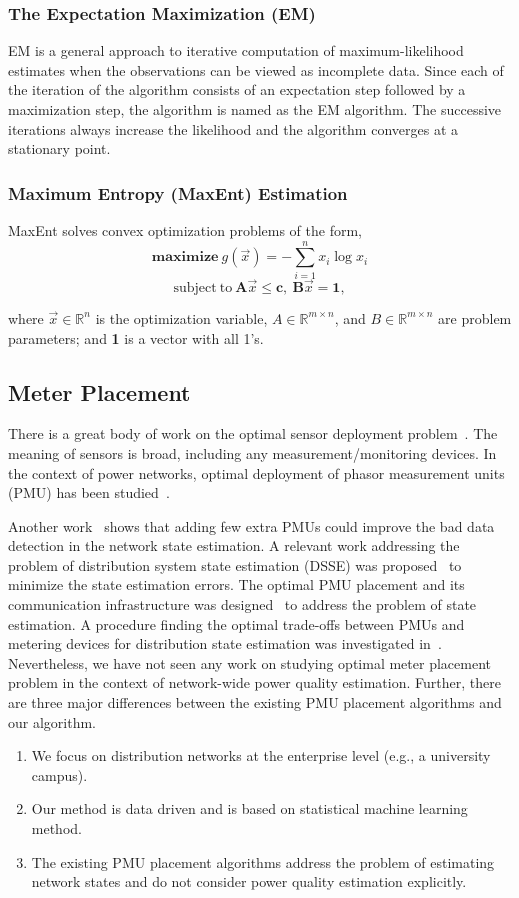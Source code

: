\subsubsection{The Expectation Maximization (EM)} EM is a general approach to iterative computation of maximum-likelihood estimates when the observations can be viewed as incomplete data. Since each of the iteration of the algorithm consists of an expectation step followed by a maximization step, the algorithm is named as the EM algorithm. The successive iterations always increase the likelihood and the algorithm converges at a stationary point.

\subsubsection{Maximum Entropy (MaxEnt) Estimation} MaxEnt solves convex optimization problems of the form,
\[\mathrm{\mathbf{maximize}}~g(\vec{x}) = - \sum_{i=1}^n x_i \log x_i \]
\[\mathrm{subject~to~} \mathbf{A}\vec{x} \leq \mathbf{c},~ \mathbf{B}\vec{x} = \mathbf{1},\]

where $\vec{x}\in \mathbb{R}^n$ is the optimization variable, $A \in \mathbb{R}^{m \times n}$, and $B \in \mathbb{R}^{m \times n}$ are problem parameters;  and \textbf{1} is a vector with all 1's.

\subsection{Meter Placement}
There is a great body of work on the optimal sensor deployment problem~\cite{Krause09}. The meaning of sensors is broad, including any measurement/monitoring devices. In the context of power networks, optimal deployment of phasor measurement units (PMU) has been studied~\cite{Yuill11}. 


Another work~\cite{chen2006placement} shows that adding few extra PMUs could improve the bad data detection in the network state estimation. A relevant work addressing the problem of distribution system state estimation (DSSE) was proposed~\cite{singh2011meter} to minimize the state estimation errors. The optimal PMU placement and its communication infrastructure was designed~\cite{shahraeini2012co} to address the problem of state estimation. A procedure finding the optimal trade-offs between PMUs and metering devices for distribution state estimation was investigated in~\cite{liu2012trade}. Nevertheless, we have not seen any work on studying optimal meter placement problem in the context of network-wide power quality estimation. Further, there are three major differences between the existing PMU placement algorithms and our algorithm.
\begin{enumerate}
\item We focus on distribution networks at the enterprise level (e.g., a university campus).
\item Our method is data driven and is based on statistical machine learning method.
\item The existing PMU placement algorithms address the problem of estimating network states and do not consider power quality estimation explicitly.
\end{enumerate}


